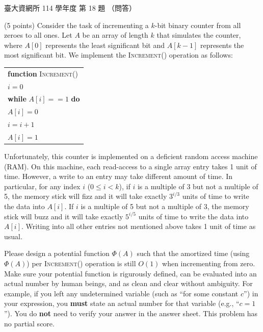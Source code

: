 \begin{pastexam}[label={px:ntu-114-dsa-18}]{臺大資網所 114 學年度 第 18 題}
（問答）

(5 points) Consider the task of incrementing a $k$-bit binary counter from all zeroes to all ones. Let $A$ be an
array of length $k$ that simulates the counter, where $A[0]$ represents the least significant bit and $A[k-1]$
represents the most significant bit. We implement the \textsc{Increment}() operation as follows:
\begin{center}
\begin{tabular}{l}
\hline
\textbf{function} \textsc{Increment}() \\
\quad $i=0$ \\
\quad \textbf{while} $A[i]==1$ \textbf{do} \\
\quad\quad $A[i]=0$ \\
\quad\quad $i=i+1$ \\
\quad $A[i]=1$ \\
\hline
\end{tabular}
\end{center}
Unfortunately, this counter is implemented on a deficient random access machine (RAM). On this machine, each
read-access to a single array entry takes 1 unit of time. However, a write to an entry may take different amount
of time. In particular, for any index $i$ ($0\le i<k$), if $i$ is a multiple of 3 but not a multiple of 5, the
memory stick will fizz and it will take exactly $3^{i/3}$ units of time to write the data into $A[i]$. If $i$ is a
multiple of 5 but not a multiple of 3, the memory stick will buzz and it will take exactly $5^{i/5}$ units of time
to write the data into $A[i]$. Writing into all other entries not mentioned above takes 1 unit of time as usual.

Please design a potential function $\Phi(A)$ such that the amortized time (using $\Phi(A)$) per
\textsc{Increment}() operation is still $O(1)$ when incrementing from zero. Make sure your potential function is
rigurously defined, can be evaluated into an actual number by human beings, and as clean and clear without
ambiguity. For example, if you left any undetermined variable (such as ``for some constant $c$'') in your
expression, you \textbf{must} state an actual number for that variable (e.g., ``$c=1$''). You do \textbf{not} need
to verify your answer in the answer sheet. This problem has no partial score.
\end{pastexam}

